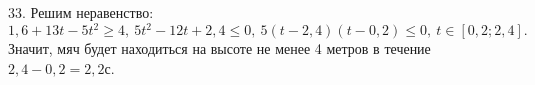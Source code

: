 33. Решим неравенство: $1,6+13t-5t^2\geqslant4,\ 5t^2-12t+2,4\leqslant0,\ 5(t-2,4)(t-0,2)\leqslant0,\ t\in[0,2;2,4].$ Значит, мяч будет находиться на высоте не менее 4 метров в течение $2,4-0,2=2,2$с.\\
